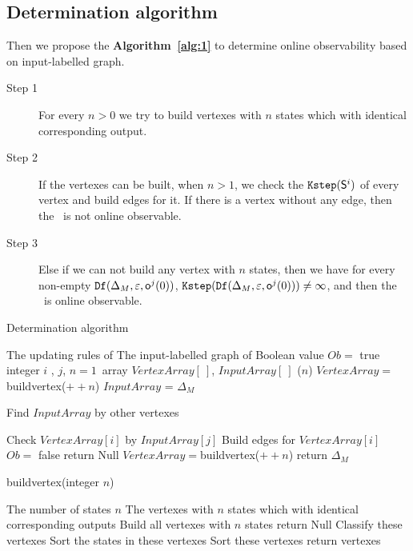  \subsection{Determination algorithm}
 Then we propose the {\bf Algorithm~\ref{alg:1}} to determine online observability based on input-labelled graph.%

\begin{description}
\item[Step 1]  For every $n>0$ we try to build vertexes with $n$ states which with identical corresponding output. 
\item[Step 2] If the vertexes can  be built, when $n>1$, we check the ${\tt Kstep}(\mathsf{S}^i)$ of every vertex and build edges for it. If there is a vertex without any edge, then the \BCN\ is not online observable.
\item[Step 3] Else if we can not build any vertex with $n$ states, then we have for every non-empty ${\tt Df}(\Delta_M,\varepsilon, \mathsf{o}^{j}(0))$, ${\tt Kstep}({\tt Df}(\Delta_M,\varepsilon, \mathsf{o}^{j}(0)))\ne\infty$, and then the \BCN\ is online observable.
 \end{description}

\begin{algorithm}[h]
\caption{Determination algorithm}
\begin{algorithmic}[1]
\REQUIRE 
The updating rules of \BCN
\ENSURE  
The input-labelled graph of \BCN
\STATE Boolean value $Ob=$ true 
\STATE integer $i$ , $j$, $n=1$\
\STATE array $VertexArray[\ ]$, $InputArray[\ ]$
($n$)
\STATE $VertexArray=${\sf buildvertex}($++n$)
\STATE $InputArray$ = $\Delta_M$ 
\ELSE

\STATE Find $InputArray$ by other vertexes

\ENDIF
{}
\STATE Check $VertexArray[i]$ by $InputArray[j]$ 
\STATE Build edges for $VertexArray[i]$ 
\ENDFOR
{}
\STATE  $Ob=$ false 
\STATE return Null
\ENDIF
\ENDFOR
\STATE $VertexArray=${\sf buildvertex}($++n$)
\ENDWHILE
\STATE return $\Delta_M$\
\end{algorithmic}
 \label{alg:1}
\end{algorithm}
\begin{algorithm}[h!]
\caption{{\sf buildvertex}(integer $n$)}
\begin{algorithmic}[1]
\REQUIRE 
The number of states $n$
\ENSURE  
The vertexes with $n$ states which with identical corresponding outputs 
\STATE  Build all vertexes with $n$ states 
\IF{(Failed to build)} 
\STATE  return Null
\ELSE 
\STATE  Classify these vertexes
\STATE Sort the states in these vertexes
\STATE Sort these vertexes
\STATE return vertexes
\ENDIF 
\end{algorithmic}
 \label{alg:2}
\end{algorithm}

